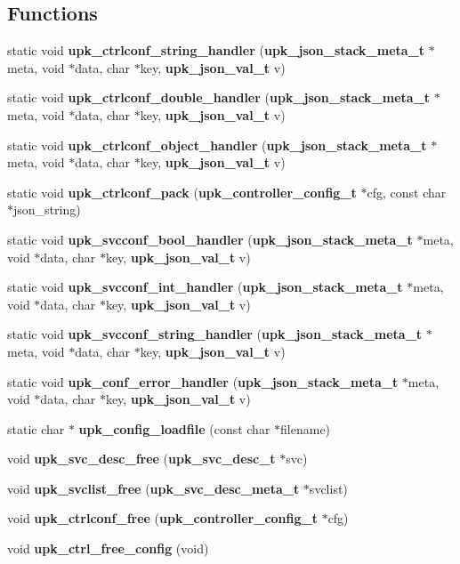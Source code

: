 \subsection*{Functions}
\begin{DoxyCompactItemize}
\item 
static void {\bf upk\_\-ctrlconf\_\-string\_\-handler} ({\bf upk\_\-json\_\-stack\_\-meta\_\-t} $\ast$meta, void $\ast$data, char $\ast$key, {\bf upk\_\-json\_\-val\_\-t} v)
\item 
static void {\bf upk\_\-ctrlconf\_\-double\_\-handler} ({\bf upk\_\-json\_\-stack\_\-meta\_\-t} $\ast$meta, void $\ast$data, char $\ast$key, {\bf upk\_\-json\_\-val\_\-t} v)
\item 
static void {\bf upk\_\-ctrlconf\_\-object\_\-handler} ({\bf upk\_\-json\_\-stack\_\-meta\_\-t} $\ast$meta, void $\ast$data, char $\ast$key, {\bf upk\_\-json\_\-val\_\-t} v)
\item 
static void {\bf upk\_\-ctrlconf\_\-pack} ({\bf upk\_\-controller\_\-config\_\-t} $\ast$cfg, const char $\ast$json\_\-string)
\item 
static void {\bf upk\_\-svcconf\_\-bool\_\-handler} ({\bf upk\_\-json\_\-stack\_\-meta\_\-t} $\ast$meta, void $\ast$data, char $\ast$key, {\bf upk\_\-json\_\-val\_\-t} v)
\item 
static void {\bf upk\_\-svcconf\_\-int\_\-handler} ({\bf upk\_\-json\_\-stack\_\-meta\_\-t} $\ast$meta, void $\ast$data, char $\ast$key, {\bf upk\_\-json\_\-val\_\-t} v)
\item 
static void {\bf upk\_\-svcconf\_\-string\_\-handler} ({\bf upk\_\-json\_\-stack\_\-meta\_\-t} $\ast$meta, void $\ast$data, char $\ast$key, {\bf upk\_\-json\_\-val\_\-t} v)
\item 
static void {\bf upk\_\-conf\_\-error\_\-handler} ({\bf upk\_\-json\_\-stack\_\-meta\_\-t} $\ast$meta, void $\ast$data, char $\ast$key, {\bf upk\_\-json\_\-val\_\-t} v)
\item 
static char $\ast$ {\bf upk\_\-config\_\-loadfile} (const char $\ast$filename)
\item 
void {\bf upk\_\-svc\_\-desc\_\-free} ({\bf upk\_\-svc\_\-desc\_\-t} $\ast$svc)
\item 
void {\bf upk\_\-svclist\_\-free} ({\bf upk\_\-svc\_\-desc\_\-meta\_\-t} $\ast$svclist)
\item 
void {\bf upk\_\-ctrlconf\_\-free} ({\bf upk\_\-controller\_\-config\_\-t} $\ast$cfg)
\item 
void {\bf upk\_\-ctrl\_\-free\_\-config} (void)
\item 

\end{DoxyCompactItemize}
